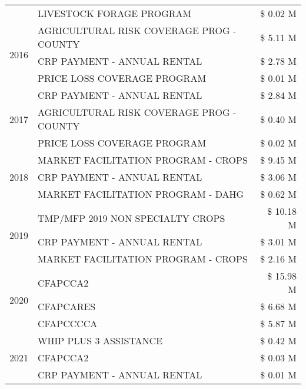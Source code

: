 \begin{tabular}{llr}
 & LIVESTOCK FORAGE PROGRAM & \$ 0.02 M \\
\cline{1-3}
\multirow[t]{3}{*}{2016} & AGRICULTURAL RISK COVERAGE PROG - COUNTY & \$ 5.11 M \\
 & CRP PAYMENT - ANNUAL RENTAL & \$ 2.78 M \\
 & PRICE LOSS COVERAGE PROGRAM & \$ 0.01 M \\
\cline{1-3}
\multirow[t]{3}{*}{2017} & CRP PAYMENT - ANNUAL RENTAL & \$ 2.84 M \\
 & AGRICULTURAL RISK COVERAGE PROG - COUNTY & \$ 0.40 M \\
 & PRICE LOSS COVERAGE PROGRAM & \$ 0.02 M \\
\cline{1-3}
\multirow[t]{3}{*}{2018} & MARKET FACILITATION PROGRAM - CROPS & \$ 9.45 M \\
 & CRP PAYMENT - ANNUAL RENTAL & \$ 3.06 M \\
 & MARKET FACILITATION PROGRAM - DAHG & \$ 0.62 M \\
\cline{1-3}
\multirow[t]{3}{*}{2019} & TMP/MFP 2019 NON SPECIALTY CROPS & \$ 10.18 M \\
 & CRP PAYMENT - ANNUAL RENTAL & \$ 3.01 M \\
 & MARKET FACILITATION PROGRAM - CROPS & \$ 2.16 M \\
\cline{1-3}
\multirow[t]{3}{*}{2020} & CFAPCCA2 & \$ 15.98 M \\
 & CFAPCARES & \$ 6.68 M \\
 & CFAPCCCCA & \$ 5.87 M \\
\cline{1-3}
\multirow[t]{3}{*}{2021} & WHIP PLUS 3 ASSISTANCE & \$ 0.42 M \\
 & CFAPCCA2 & \$ 0.03 M \\
 & CRP PAYMENT - ANNUAL RENTAL & \$ 0.01 M \\
\cline{1-3}
\bottomrule
\end{tabular}
